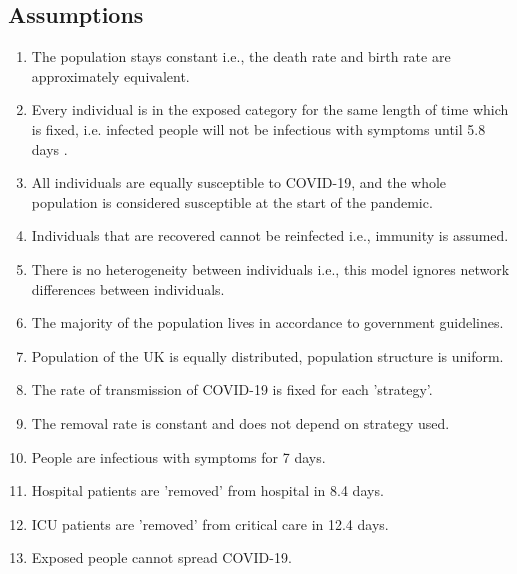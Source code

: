 \documentclass[11pt]{article}
\begin{document}
\subsection{Assumptions}
	\begin{enumerate}
	    \item The population stays constant i.e., the death rate and birth rate are approximately equivalent.
	    \item Every individual is in the exposed category for the same length of time which is fixed, i.e. infected people will not be infectious with symptoms until 5.8 days \citep{10.1093/cid/ciab746}.
	    \item All individuals are equally susceptible to COVID-19, and the whole population is considered susceptible at the start of the pandemic.
               \item Individuals that are recovered cannot be reinfected i.e., immunity is assumed.
               \item There is no heterogeneity between individuals i.e., this model ignores network differences between individuals. 
               \item The majority of the population lives in accordance to government guidelines.
               \item Population of the UK is equally distributed, population structure is uniform.
               \item The rate of transmission of COVID-19 is fixed for each 'strategy'.
               \item The removal rate is constant and does not depend on strategy used.
               \item People are infectious with symptoms for 7 days\citep{he2020temporal}.
               \item Hospital patients are 'removed' from hospital in 8.4 days\citep{vekaria2021hospital}.
               \item ICU patients are 'removed' from critical care in 12.4 days\citep{vekaria2021hospital}. 
               \item Exposed people cannot spread COVID-19.
	\end{enumerate}
\end{document}
